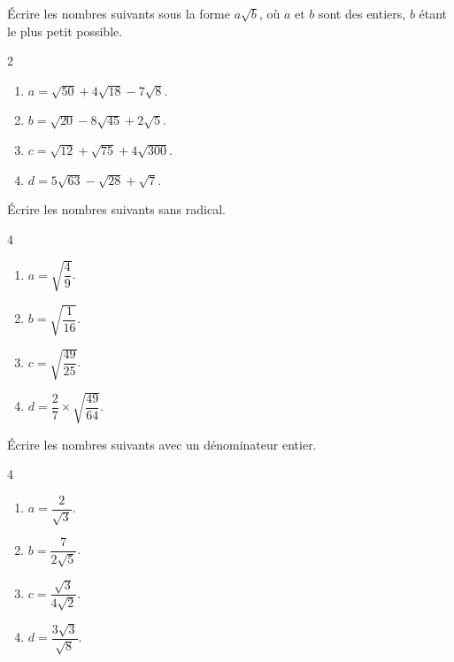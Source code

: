 \exo

Écrire les nombres suivants sous la forme $a\sqrt{b}$, où $a$ et $b$ sont des entiers, $b$ étant le plus petit possible.

\vspace{-6pt}
\setlength{\columnsep}{1cm}
\setlength{\columnseprule}{0pt}
\begin{multicols}{2}
\begin{enumerate}
\item $a=\sqrt{50}+4\sqrt{18}-7\sqrt{8}$.
\medskip
\item $b=\sqrt{20}-8\sqrt{45}+2\sqrt{5}$.
\item $c=\sqrt{12}+\sqrt{75}+4\sqrt{300}$.
\medskip
\item $d=5\sqrt{63}-\sqrt{28}+\sqrt{7}$.
\end{enumerate}
\end{multicols}
\vspace{-6pt}

\exo

Écrire les nombres suivants sans radical.

\vspace{-6pt}
\setlength{\columnsep}{1cm}
\setlength{\columnseprule}{0pt}
\begin{multicols}{4}
\begin{enumerate}
\item $a=\sqrt{\dfrac{4}{9}}$.
\item $b=\sqrt{\dfrac{1}{16}}$.
\item $c=\sqrt{\dfrac{49}{25}}$.
\item $d=\dfrac{2}{7}\times\sqrt{\dfrac{49}{64}}$.
\end{enumerate}
\end{multicols}
\vspace{-6pt}

\exo

Écrire les nombres suivants avec un dénominateur entier.

\vspace{-6pt}
\setlength{\columnsep}{1cm}
\setlength{\columnseprule}{0pt}
\begin{multicols}{4}
\begin{enumerate}
\item $a=\dfrac{2}{\sqrt{3}}$.
\item $b=\dfrac{7}{2\sqrt{5}}$.
\item $c=\dfrac{\sqrt{3}}{4\sqrt{2}}$.
\item $d=\dfrac{3\sqrt{3}}{\sqrt{8}}$.
\end{enumerate}
\end{multicols}
\vspace{-6pt}

